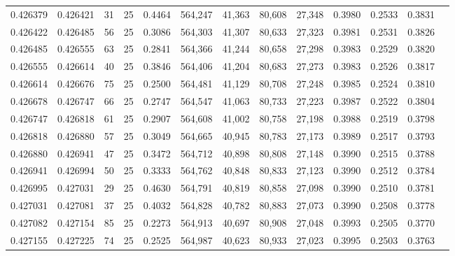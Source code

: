 \begin{tabular}{rrrrrrrrrrrrr}
0.426379 & 0.426421 &    31 &  25 &                                     0.4464 & 564,247 &  41,363 &  80,608 &  27,348 & 0.3980 & 0.2533 & 0.3831 \\
0.426422 & 0.426485 &    56 &  25 &                                     0.3086 & 564,303 &  41,307 &  80,633 &  27,323 & 0.3981 & 0.2531 & 0.3826 \\
0.426485 & 0.426555 &    63 &  25 &                                     0.2841 & 564,366 &  41,244 &  80,658 &  27,298 & 0.3983 & 0.2529 & 0.3820 \\
0.426555 & 0.426614 &    40 &  25 &                                     0.3846 & 564,406 &  41,204 &  80,683 &  27,273 & 0.3983 & 0.2526 & 0.3817 \\
0.426614 & 0.426676 &    75 &  25 &                                     0.2500 & 564,481 &  41,129 &  80,708 &  27,248 & 0.3985 & 0.2524 & 0.3810 \\
0.426678 & 0.426747 &    66 &  25 &                                     0.2747 & 564,547 &  41,063 &  80,733 &  27,223 & 0.3987 & 0.2522 & 0.3804 \\
0.426747 & 0.426818 &    61 &  25 &                                     0.2907 & 564,608 &  41,002 &  80,758 &  27,198 & 0.3988 & 0.2519 & 0.3798 \\
0.426818 & 0.426880 &    57 &  25 &                                     0.3049 & 564,665 &  40,945 &  80,783 &  27,173 & 0.3989 & 0.2517 & 0.3793 \\
0.426880 & 0.426941 &    47 &  25 &                                     0.3472 & 564,712 &  40,898 &  80,808 &  27,148 & 0.3990 & 0.2515 & 0.3788 \\
0.426941 & 0.426994 &    50 &  25 &                                     0.3333 & 564,762 &  40,848 &  80,833 &  27,123 & 0.3990 & 0.2512 & 0.3784 \\
0.426995 & 0.427031 &    29 &  25 &                                     0.4630 & 564,791 &  40,819 &  80,858 &  27,098 & 0.3990 & 0.2510 & 0.3781 \\
0.427031 & 0.427081 &    37 &  25 &                                     0.4032 & 564,828 &  40,782 &  80,883 &  27,073 & 0.3990 & 0.2508 & 0.3778 \\
0.427082 & 0.427154 &    85 &  25 &                                     0.2273 & 564,913 &  40,697 &  80,908 &  27,048 & 0.3993 & 0.2505 & 0.3770 \\
0.427155 & 0.427225 &    74 &  25 &                                     0.2525 & 564,987 &  40,623 &  80,933 &  27,023 & 0.3995 & 0.2503 & 0.3763 \\

\end{tabular}
